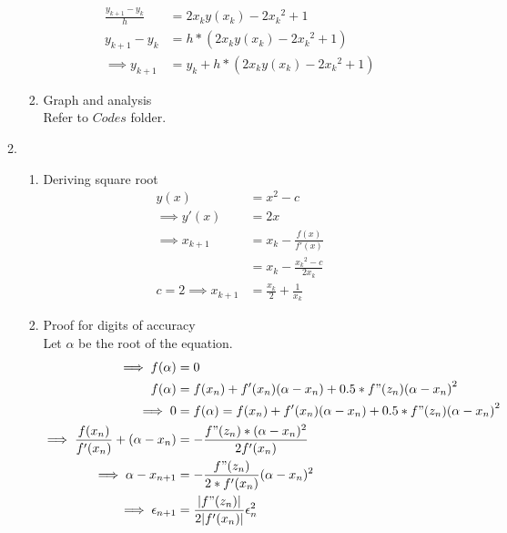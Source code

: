 \documentclass[11pt]{article}
\begin{document}
\begin{enumerate}
\begin{enumerate}
\begin{enumerate}
										\begin{align*}
											\frac{y_{k+1} - y_{k}}{h} &= 2x_ky(x_k) -2{x_k}^2 +1 \\
											y_{k+1} - y_k &= h*(2x_ky(x_k) - 2{x_k}^2 +1) \\
											\implies y_{k+1} &= y_k + h*(2x_ky(x_k) -2{x_k}^2 +1)
										\end{align*}
								\item Graph and analysis \\
										Refer to $Codes$ folder.
						\end{enumerate}
				\item %
						\begin{enumerate}
								\item Deriving square root \\
										\begin{align*}
											 y(x) &= x^2-c \\
												\implies y'(x) &= 2x\\
												\implies  x_{k+1} &= x_{k} - \frac{f(x)}{f'(x)} \\
												&= x_{k} - \frac{{x_k}^2 - c}{2x_k} \\
												 c=2 \implies x_{k+1} &= \frac{x_k}{2} + \frac{1}{x_k} 
										\end{align*}
								\item Proof for digits of accuracy \\
										Let $\alpha$ be the root of the equation. \\
										\begin{align*}
												\implies f(\alpha)&=0 \\
												f(\alpha)&= f(x_n) + f'(x_n)(\alpha - x_n) + 0.5*f"(z_n){(\alpha - x_n)}^2 \\
												\implies 0 &=f(\alpha) = f(x_n) + f'(x_n)(\alpha - x_n) + 0.5*f"(z_n){(\alpha - x_n)}^2 \\
												\implies \frac{f(x_n)}{f'(x_n)} + (\alpha - x_n) &= -\frac{f"(z_n)*(\alpha - x_n)^2}{2f'(x_n)} \\
												\implies \alpha - x_{n+1} &= -\frac{f"(z_n)}{2*f'(x_n)}(\alpha - x_n)^2 \\
												\implies \epsilon_{n+1} &= \frac{|f"(z_n)|}{2|f'(x_n)|}\epsilon_n^2
										\end{align*}


\end{enumerate}
\end{enumerate}
\end{enumerate}
\end{document}
